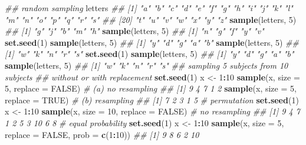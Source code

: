 \documentclass[
]{book}
\newenvironment{Shaded}{\begin{snugshade}}{\end{snugshade}}
\newcommand{\CommentTok}[1]{\textcolor[rgb]{0.56,0.35,0.01}{\textit{#1}}}
\newcommand{\DataTypeTok}[1]{\textcolor[rgb]{0.13,0.29,0.53}{#1}}
\newcommand{\DecValTok}[1]{\textcolor[rgb]{0.00,0.00,0.81}{#1}}
\newcommand{\KeywordTok}[1]{\textcolor[rgb]{0.13,0.29,0.53}{\textbf{#1}}}
\newcommand{\NormalTok}[1]{#1}
\newcommand{\OperatorTok}[1]{\textcolor[rgb]{0.81,0.36,0.00}{\textbf{#1}}}
\newcommand{\OtherTok}[1]{\textcolor[rgb]{0.56,0.35,0.01}{#1}}
\newcommand{\StringTok}[1]{\textcolor[rgb]{0.31,0.60,0.02}{#1}}
\begin{document}
\begin{Shaded}
\begin{Highlighting}[]
\CommentTok{\#\# random sampling}
\NormalTok{letters}
\CommentTok{\#\#  [1] "a" "b" "c" "d" "e" "f" "g" "h" "i" "j" "k" "l" "m" "n" "o" "p" "q" "r" "s"}
\CommentTok{\#\# [20] "t" "u" "v" "w" "x" "y" "z"}
\KeywordTok{sample}\NormalTok{(letters, }\DecValTok{5}\NormalTok{)}
\CommentTok{\#\# [1] "g" "j" "b" "m" "h"}
\KeywordTok{sample}\NormalTok{(letters, }\DecValTok{5}\NormalTok{)}
\CommentTok{\#\# [1] "n" "g" "f" "y" "v"}
\KeywordTok{set.seed}\NormalTok{(}\DecValTok{1}\NormalTok{)}
\KeywordTok{sample}\NormalTok{(letters, }\DecValTok{5}\NormalTok{)}
\CommentTok{\#\# [1] "y" "d" "g" "a" "b"}
\KeywordTok{sample}\NormalTok{(letters, }\DecValTok{5}\NormalTok{)}
\CommentTok{\#\# [1] "w" "k" "n" "r" "s"}
\KeywordTok{set.seed}\NormalTok{(}\DecValTok{1}\NormalTok{)}
\KeywordTok{sample}\NormalTok{(letters, }\DecValTok{5}\NormalTok{)}
\CommentTok{\#\# [1] "y" "d" "g" "a" "b"}
\KeywordTok{sample}\NormalTok{(letters, }\DecValTok{5}\NormalTok{)}
\CommentTok{\#\# [1] "w" "k" "n" "r" "s"}
\CommentTok{\#\# sampling 5 subjects from 10 subjects}
\CommentTok{\#\# without or with replacement}
\KeywordTok{set.seed}\NormalTok{(}\DecValTok{1}\NormalTok{)}
\NormalTok{x \textless{}{-}}\StringTok{ }\DecValTok{1}\OperatorTok{:}\DecValTok{10}
\KeywordTok{sample}\NormalTok{(x, }\DataTypeTok{size =} \DecValTok{5}\NormalTok{, }\DataTypeTok{replace =} \OtherTok{FALSE}\NormalTok{) }\CommentTok{\# (a) no resampling}
\CommentTok{\#\# [1] 9 4 7 1 2}
\KeywordTok{sample}\NormalTok{(x, }\DataTypeTok{size =} \DecValTok{5}\NormalTok{, }\DataTypeTok{replace =} \OtherTok{TRUE}\NormalTok{)  }\CommentTok{\# (b) resampling}
\CommentTok{\#\# [1] 7 2 3 1 5}
\CommentTok{\# permutation}
\KeywordTok{set.seed}\NormalTok{(}\DecValTok{1}\NormalTok{)}
\NormalTok{x \textless{}{-}}\StringTok{ }\DecValTok{1}\OperatorTok{:}\DecValTok{10}
\KeywordTok{sample}\NormalTok{(x, }\DataTypeTok{size =} \DecValTok{10}\NormalTok{, }\DataTypeTok{replace =} \OtherTok{FALSE}\NormalTok{) }\CommentTok{\# no resampling}
\CommentTok{\#\#  [1]  9  4  7  1  2  5  3 10  6  8}
\CommentTok{\# equal probability}
\KeywordTok{set.seed}\NormalTok{(}\DecValTok{1}\NormalTok{)}
\NormalTok{x \textless{}{-}}\StringTok{ }\DecValTok{1}\OperatorTok{:}\DecValTok{10}
\KeywordTok{sample}\NormalTok{(x, }\DataTypeTok{size =} \DecValTok{5}\NormalTok{, }\DataTypeTok{replace =} \OtherTok{FALSE}\NormalTok{, }\DataTypeTok{prob =} \KeywordTok{c}\NormalTok{(}\DecValTok{1}\OperatorTok{:}\DecValTok{10}\NormalTok{))}
\CommentTok{\#\# [1]  9  8  6  2 10}

\end{Highlighting}
\end{Shaded}
\end{document}
